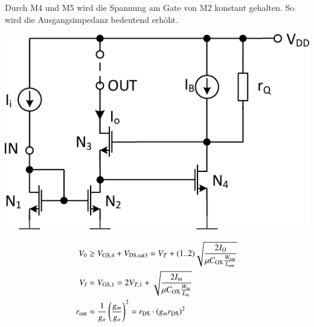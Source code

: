 Durch M4 und M5 wird die Spannung am Gate von M2 konstant gehalten. %
So wird die Ausgangsimpedanz bedeutend erhöht.


\begin{minipage}[t]{0.42\columnwidth}
    \includegraphics[width=\columnwidth, align=t]{images/06_stormspiegel_geregelte_kaskode.pdf}

\end{minipage}
\hfill
\begin{minipage}[t]{0.56\columnwidth}

    \vspace{-0.4cm}

    \begin{align*}
        V_0         &\geq V_{\rm GS,4} + V_{\rm DS,sat3} = V_T + (1..2) \sqrt{ \frac{2 I_O}{\mu C_{\rm OX} \frac{W_{\rm out}}{L_{\rm out}}} }                                                                                           \\
        V_I         &= V_{\rm GS,1} = 2 V_{T,1} + \sqrt{ \frac{2 I_{\rm in}}{\mu C_{\rm OX} \frac{W_{\rm in}}{L_{\rm in}}} }                                                                                                                                     \\
        r_{\rm out} &\approx \frac{1}{g_o} \left( \frac{g_m}{g_o} \right)^2 = r_{\rm DS} \cdot (g_m r_{\rm DS})^2
    \end{align*}
\end{minipage}


